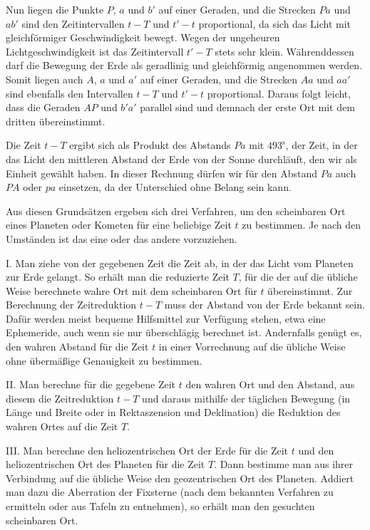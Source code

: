 Nun liegen die Punkte $P$, $a$ und $b'$ auf einer Geraden, und die Strecken $Pa$ und $ab'$ sind den Zeitintervallen $t-T$ und $t'-t$ proportional, da sich das Licht mit gleichförmiger Geschwindigkeit bewegt. Wegen der ungeheuren Lichtgeschwindigkeit ist das Zeitintervall $t'-T$ stets sehr klein. Währenddessen darf die Bewegung der Erde als geradlinig und gleichförmig angenommen werden. Somit liegen auch $A$, $a$ und $a'$ auf einer Geraden, und die Strecken $Aa$ und $aa'$ sind ebenfalls den Intervallen $t-T$ und $t'-t$ proportional. Daraus folgt leicht, dass die Geraden $AP$ und $b'a'$ parallel sind und demnach der erste Ort mit dem dritten übereinstimmt.

Die Zeit $t-T$ ergibt sich als Produkt des Abstands $Pa$ mit $493^{\mathrm{s}}$, der Zeit, in der das Licht den mittleren Abstand der Erde von der Sonne durchläuft, den wir als Einheit gewählt haben. In dieser Rechnung dürfen wir für den Abstand $Pa$ auch $PA$ oder $pa$ einsetzen, da der Unterschied ohne Belang sein kann.

Aus diesen Grundsätzen ergeben sich drei Verfahren, um den scheinbaren Ort eines Planeten oder Kometen für eine beliebige Zeit $t$ zu bestimmen. Je nach den Umständen ist das eine oder das andere vorzuziehen.

I. Man ziehe von der gegebenen Zeit die Zeit ab, in der das Licht vom Planeten zur Erde gelangt. So erhält man die reduzierte Zeit $T$, für die der auf die übliche Weise berechnete wahre Ort mit dem scheinbaren Ort für $t$ übereinstimmt. Zur Berechnung der Zeitreduktion $t-T$ muss der Abstand von der Erde bekannt sein. Dafür werden meist bequeme Hilfsmittel zur Verfügung stehen, etwa eine Ephemeride, auch wenn sie nur überschlägig berechnet ist. Andernfalls genügt es, den wahren Abstand für die Zeit $t$ in einer Vorrechnung auf die übliche Weise ohne übermäßige Genauigkeit zu bestimmen.

II. Man berechne für die gegebene Zeit $t$ den wahren Ort und den Abstand, aus diesem die Zeitreduktion $t-T$ und daraus mithilfe der täglichen Bewegung (in Länge und Breite oder in Rektaszension und Deklination) die Reduktion des wahren Ortes auf die Zeit $T$.

III. Man berechne den heliozentrischen Ort der Erde für die Zeit $t$ und den heliozentrischen Ort des Planeten für die Zeit $T$. Dann bestimme man aus ihrer Verbindung auf die übliche Weise den geozentrischen Ort des Planeten. Addiert man dazu die Aberration der Fixsterne (nach dem bekannten Verfahren zu ermitteln oder aus Tafeln zu entnehmen), so erhält man den gesuchten scheinbaren Ort.

